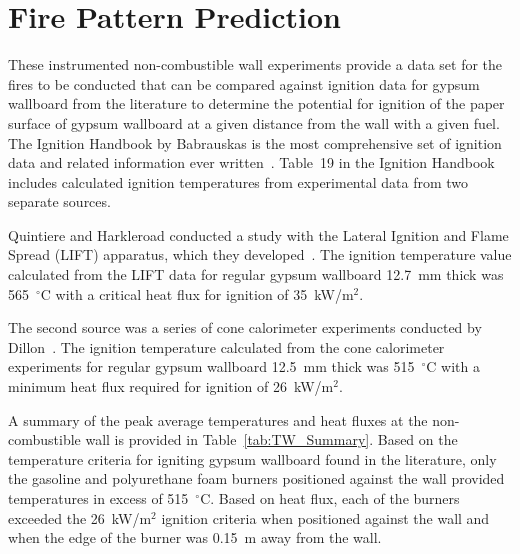 \documentclass[twoside]{uocthesis}
\begin{document}
{\section{Fire Pattern Prediction}

These instrumented non-combustible wall experiments provide a data set for the fires to be conducted that can be compared against ignition data for gypsum wallboard from the literature to determine the potential for ignition of the paper surface of gypsum wallboard at a given distance from the wall with a given fuel. The Ignition Handbook by Babrauskas is the most comprehensive set of ignition data and related information ever written~\cite{Babrauskas:2003}.  Table~19 in the Ignition Handbook includes calculated ignition temperatures from experimental data from two separate sources.

Quintiere and Harkleroad conducted a study with the Lateral Ignition and Flame Spread (LIFT) apparatus, which they developed~\cite{ASTM_E1321,Quintiere:1985}.
The ignition temperature value calculated from the LIFT data for regular gypsum wallboard 12.7~mm thick was 565~$^{\circ}$C with a critical heat flux for ignition of 35~kW/m$^2$.

The second source was a series of cone calorimeter experiments conducted by Dillon~\cite{ASTM_E1354,Dillon:1998}. The ignition temperature calculated from the cone calorimeter experiments for regular gypsum wallboard 12.5~mm thick was 515~$^{\circ}$C with a minimum heat flux required for ignition of 26~kW/m$^2$.

A summary of the peak average temperatures and heat fluxes at the non-combustible wall is provided in Table~\ref{tab:TW_Summary}.   Based on the temperature criteria for igniting gypsum wallboard found in the literature, only the gasoline and polyurethane foam burners positioned against the wall provided temperatures in excess of 515~$^{\circ}$C.  Based on heat flux, each of the burners exceeded the 26~kW/m$^2$ ignition criteria when positioned against the wall and when the edge of the burner was 0.15~m away from the wall.  

}
\end{document}
